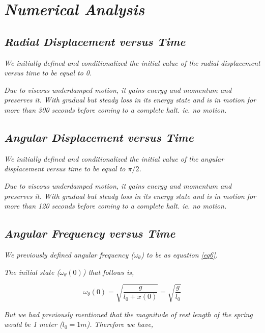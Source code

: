 \section{\textit{Numerical Analysis}}
        
    \subsection{\textit{Radial Displacement versus Time}}
            
                \textit{We initially defined and conditionalized the initial value of the radial displacement versus time to be equal to 0.}
                
                \textit{Due to viscous underdamped motion, it gains energy and momentum and preserves it. With gradual but steady loss in its energy state and is in motion for more than 300 seconds before coming to a complete halt. ie. no motion.}
    
    \subsection{\textit{Angular Displacement versus Time}}
            
                \textit{We initially defined and conditionalized the initial value of the angular displacement versus time to be equal to $\pi/2$.}
                
                \textit{Due to viscous underdamped motion, it gains energy and momentum and preserves it. With gradual but steady loss in its energy state and is in motion for more than 120 seconds before coming to a complete halt. ie. no motion.}
    
                
    \subsection{\textit{Angular Frequency versus Time}}
                
                \textit{We previously defined angular frequency ($\omega_\theta$) to be as equation \ref{eq6}.}
                
                \textit{The initial state ($\omega_\theta(0)$) that follows is,}
                
                $$\omega_\theta(0) = \sqrt{\frac{g}{l_0 + x(0)}} = \sqrt{\frac{g}{l_0}}$$
                
                \textit{But we had previously mentioned that the magnitude of rest length of the spring would be 1 meter ($l_0 = 1 m$). Therefore we have,}
                
